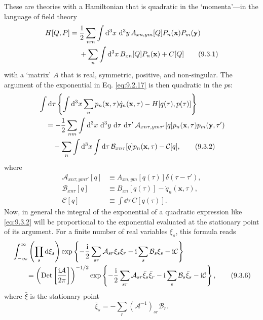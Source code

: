 These are theories with a Hamiltonian that is quadratic in the `momenta'---in
the language of field theory
\begin{align}
H[Q,P]={}&\frac12\sum_{nm}\int \mathop{}\!\mathrm{d}^3x\,\mathop{}\!\mathrm{d}^3y\,
 A_{xn,ym}[Q]P_n(\mathbf{x})P_m(\mathbf{y})
\notag\\
&+\sum_n\int \mathop{}\!\mathrm{d}^3x\,B_{xn}[Q]P_n(\mathbf{x})+C[Q]
\tag{9.3.1}\label{eq:9.3.1}
\end{align}
with a `matrix' $A$ that is real, symmetric, positive, and non-singular. The
argument of the exponential in Eq. \eqref{eq:9.2.17} is then quadratic in the $p$s:
\begin{align}
&\int \dd\tau\left\{\int \dd^3x\sum_n p_n(\mathbf{x},\tau)
 \dot q_n(\mathbf{x},\tau)-H[q(\tau),p(\tau)]\right\}
\notag\\
&\quad=-\frac12\sum_{nm}\int \dd^3x\,\dd^3y\,\dd\tau\,\dd\tau'\,
 \mathcal A_{xn\tau,ym\tau'}[q]p_n(\mathbf{x},\tau)p_m(\mathbf{y},\tau')
\notag\\
&\qquad-\sum_n\int \dd^3x\int \dd\tau\,
 \mathcal B_{xn\tau}[q]p_n(\mathbf{x},\tau)-\mathcal C[q],
\tag{9.3.2}\label{eq:9.3.2}
\end{align}
where
\begin{align}
\mathcal A_{xn\tau,ym\tau'}[q]
&\equiv A_{xn,ym}[q(\tau)]\delta(\tau-\tau'),
\tag{9.3.3}\label{eq:9.3.3}\\
\mathcal B_{xn\tau}[q]
&\equiv B_{xn}[q(\tau)]-\dot q_n(\mathbf{x},\tau),
\tag{9.3.4}\label{eq:9.3.4}\\
\mathcal C[q]&\equiv\int \dd\tau\,C[q(\tau)].
\tag{9.3.5}\label{eq:9.3.5}
\end{align}
Now, in general the integral of the exponential of a quadratic expression
like \eqref{eq:9.3.2} will be proportional to the exponential evaluated at the
stationary point of its argument. For a finite number of real variables
$\xi_s$, this formula reads
\begin{align}
&\int_{-\infty}^{\infty}\left(\prod_s \mathop{}\!\mathrm{d}\xi_s\right)
 \exp\left\{-\frac{\mathrm{i}}{2}\sum_{sr}\mathcal A_{sr}\xi_s\xi_r
 -\mathrm{i}\sum_s\mathcal B_s\xi_s-\mathrm{i}\mathcal C\right\}
\notag\\
&\qquad=
 \left(\operatorname{Det}\left[\frac{\mathrm{i}\mathcal A}{2\pi}\right]\right)^{-1/2}
 \exp\left\{-\frac{\mathrm{i}}{2}\sum_{sr}\mathcal A_{sr}\bar\xi_s\bar\xi_r
 -\mathrm{i}\sum_s\mathcal B_s\bar\xi_s-\mathrm{i}\mathcal C\right\},
\tag{9.3.6}\label{eq:9.3.6}
\end{align}
where $\bar\xi$ is the stationary point
\begin{equation}
\bar\xi_s=-\sum_r(\mathcal A^{-1})_{sr}\mathcal B_r.
\tag{9.3.7}\label{eq:9.3.7}
\end{equation}
